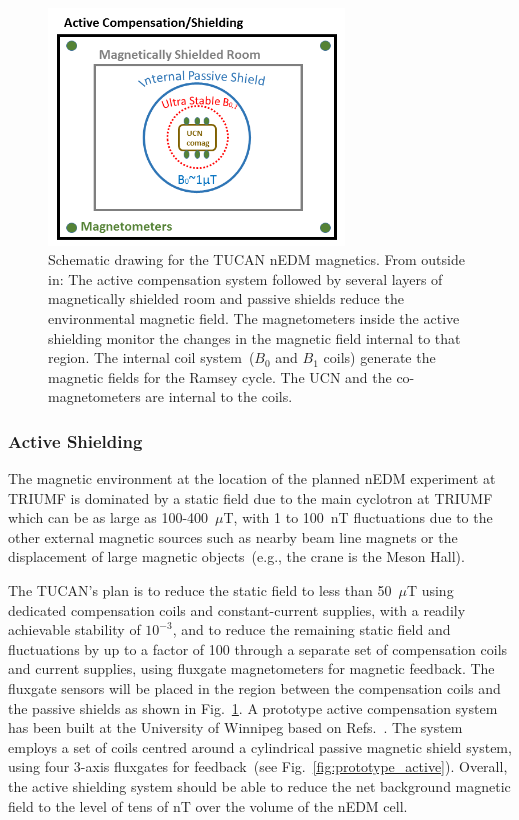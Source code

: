 \begin{figure}[h!]
  \centering
  \includegraphics[width=0.7\textwidth]{magneticscheme.png}
  \caption[Schematic of TUCAN's nEDM magnetics components]{Schematic
    drawing for the TUCAN nEDM magnetics. From outside in: The active
    compensation system followed by several layers of magnetically
    shielded room and passive shields reduce the environmental
    magnetic field. The magnetometers inside the active shielding
    monitor the changes in the magnetic field internal to that
    region. The internal coil system~($B_0$ and $B_1$ coils) generate
    the magnetic fields for the Ramsey cycle. The UCN and the
    co-magnetometers are internal to the coils.  }
  \label{fig:magneticscheme}
\end{figure}



\subsubsection{Active Shielding}

The magnetic environment at the location of the planned nEDM
experiment at TRIUMF is dominated by a static field due to the main
cyclotron at TRIUMF which can be as large as 100-400~$\mu$T, with 1 to
100~nT fluctuations due to the other external magnetic sources such as
nearby beam line magnets or the displacement of large magnetic
objects~(e.g., the crane is the Meson Hall).

The TUCAN's plan is to reduce the static field to less than 50~$\mu$T
using dedicated compensation coils and constant-current supplies, with
a readily achievable stability of $10^{-3}$, and to reduce the
remaining static field and fluctuations by up to a factor of 100
through a separate set of compensation coils and current supplies,
using fluxgate magnetometers for magnetic feedback. The fluxgate
sensors will be placed in the region between the compensation coils
and the passive shields as shown in Fig.~\ref{fig:magneticscheme}.  A
prototype active compensation system has been built at the University
of Winnipeg based on Refs.~\cite{beatrice,afach2014dynamic}. The
system employs a set of coils centred around a cylindrical passive
magnetic shield system, using four 3-axis fluxgates for feedback~(see
Fig.~\ref{fig:prototype_active}). Overall, the active shielding system
should be able to reduce the net background magnetic field to the
level of tens of nT over the volume of the nEDM cell.


